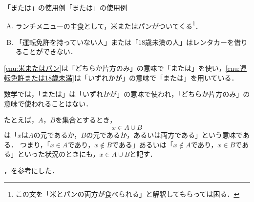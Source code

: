 \documentclass[a4paper,11pt]{ltjsarticle}
\begin{document}
\begin{example}{「または」の使用例}{「または」の使用例}
    \begin{enumerate}[(A)]
	\item ランチメニューの主食として，米またはパンがついてくる\footnote{この文を「米とパンの両方が食べられる」と解釈してもらっては困る．}．\label{enu:米またはパン}
	\item 「運転免許を持っていない人」または「18歳未満の人」はレンタカーを借りることができない． \label{enu:運転免許または18歳未満}
	\end{enumerate}
\ref{enu:米またはパン}は「どちらか片方のみ」の意味で「または」を使い，\ref{enu:運転免許または18歳未満}は「いずれかが」の意味で「または」を用いている．
\end{example}

数学では，「または」は「いずれかが」の意味で使われ，「どちらか片方のみ」の意味で使われることはない．

たとえば，$A$，$B$を集合とするとき，
\[
x \in A \cup B
\]
は「$x$は$A$の元であるか，$B$の元であるか，あるいは両方である」という意味である．
つまり，「$ x \in A$であり，$x \notin  B$である」あるいは「$ x \notin A$であり，$x \in B$である」といった状況のときにも，$x \in A \cup B$と記す．
\newpage 

\cite{nakajima}，\cite{kaneko}を参考にした．

\printbibliography[title=参考文献]
\end{document}
